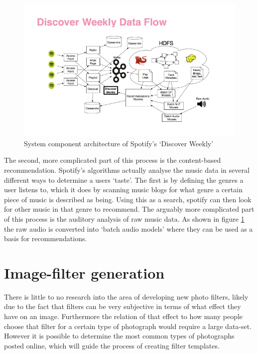 \documentclass[a4paper,12pt]{article}
\begin{document}
      \begin{figure}[ht]
        \centering
        \includegraphics[width=\linewidth]{images/discoverweekly-dataflow}
        \caption[System component architecture of Spotify's ‘Discover Weekly’]{System component architecture of Spotify's ‘Discover Weekly’ \protect\citep{johnson2015dw}}
        \label{fig:discoverweekly-dataflow}
      \end{figure}

      The second, more complicated part of this process is the content-based recommendation. Spotify's algorithms actually analyse the music data in several different ways to determine a users ‘taste’. The first is by defining the genres a user listens to, which it does by scanning music blogs for what genre a certain piece of music is described as being. Using this as a search, spotify can then look for other music in that genre to recommend. The arguably more complicated part of this process is the auditory analysis of raw music data. As shown in figure \ref{fig:discoverweekly-dataflow} the raw audio is converted into ‘batch audio models’ where they can be used as a basis for recommendations.


\section{Image-filter generation}
  There is little to no research into the area of developing new photo filters, likely due to the fact that filters can be very subjective in terms of what effect they have on an image. Furthermore the relation of that effect to how many people choose that filter for a certain type of photograph would require a large data-set. However it is possible to determine the most common types of photographs posted online, which will guide the process of creating filter templates.
\end{document}
